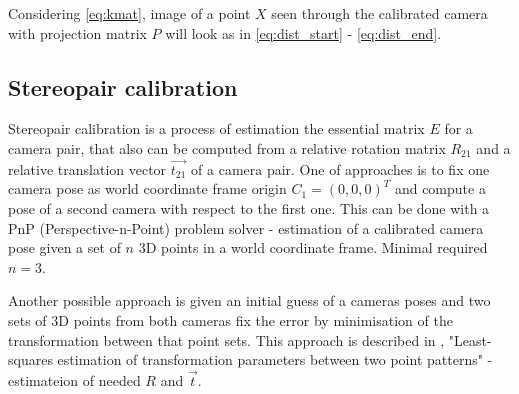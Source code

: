 Considering \autoref{eq:kmat}, image of a point $X$ seen through the calibrated camera with projection matrix $P$ will look as in \autoref{eq:dist_start} - \autoref{eq:dist_end}.

\subsection{Stereopair calibration}

Stereopair calibration is a process of estimation the essential matrix $E$ for a camera pair, that also can be computed from a relative rotation matrix $R_{21}$ and a relative translation vector $\vec{t_{21}}$ of a camera pair. One of approaches is to fix one camera  pose as world coordinate frame origin $C_1 = (0, 0, 0)^T$ and compute a pose of a second camera with respect to the first one. This can be done with a PnP (Perspective-n-Point) problem solver - estimation of a calibrated camera pose given a set of $n$ 3D points in a world coordinate frame. Minimal required $n=3$. 

Another possible approach is given an initial guess of a cameras poses and two sets of 3D points from both cameras fix the error by minimisation of the transformation between that point sets. This approach is described in \cite{Umeyama1991}, "Least-squares estimation of transformation parameters between two point patterns" - estimateion of needed $R$ and $\vec{t}$.